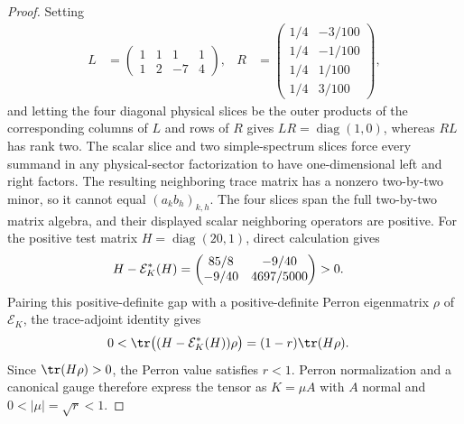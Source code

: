 \begin{proof}\leanok
    Setting
    \begin{align}
        L & =\begin{pmatrix}1&1&1&1\\1&2&-7&4\end{pmatrix}, &
        R & =\begin{pmatrix}
                 1/4 & -3/100 \\1/4&-1/100\\1/4&1/100\\1/4&3/100
             \end{pmatrix},
    \end{align}
    and letting the four diagonal physical slices be the outer products of the
    corresponding columns of $L$ and rows of $R$ gives
    $LR=\operatorname{diag}(1,0)$, whereas $RL$ has rank two. The scalar
    slice and two simple-spectrum slices force every summand in any
    physical-sector factorization to have one-dimensional left and right
    factors. The resulting neighboring trace matrix has a nonzero
    two-by-two minor, so it cannot equal $(a_kb_h)_{k,h}$. The four slices
    span the full two-by-two matrix algebra, and their displayed scalar
    neighboring operators are positive. For the positive test matrix
    $H=\operatorname{diag}(20,1)$, direct calculation gives
    \begin{align}
        H-\mathcal E_K^*(H)
         & =\begin{pmatrix}85/8&-9/40\\-9/40&4697/5000\end{pmatrix}>0.
        \notag
    \end{align}
    Pairing this positive-definite gap with a positive-definite Perron
    eigenmatrix $\rho$ of $\mathcal E_K$, the trace-adjoint identity gives
    \begin{align}
        0
         & <\tr\bigl((H-\mathcal E_K^*(H))\rho\bigr)
        =(1-r)\tr(H\rho).
        \notag
    \end{align}
    Since $\tr(H\rho)>0$, the Perron value satisfies $r<1$. Perron
    normalization and a canonical gauge therefore express the tensor as
    $K=\mu A$ with $A$ normal and $0<|\mu|=\sqrt r<1$.
\end{proof}

